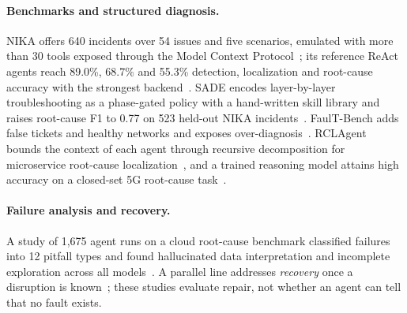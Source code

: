 \documentclass[pdflatex,sn-basic,Numbered,iicol]{sn-jnl}
\begin{document}
\paragraph{Benchmarks and structured diagnosis.} NIKA offers 640 incidents over 54 issues and five scenarios, emulated with more than 30 tools exposed through the Model Context Protocol~\cite{mcp2024}; its reference ReAct~\cite{yao2023react} agents reach 89.0\%, 68.7\% and 55.3\% detection, localization and root-cause accuracy with the strongest backend~\cite{wang2025nika}. SADE encodes layer-by-layer troubleshooting as a phase-gated policy with a hand-written skill library and raises root-cause F1 to 0.77 on 523 held-out NIKA incidents~\cite{tseng2026sade}. FaulT-Bench adds false tickets and healthy networks and exposes over-diagnosis~\cite{tseng2026faultbench}. RCLAgent bounds the context of each agent through recursive decomposition for microservice root-cause localization~\cite{zhang2026rclagent}, and a trained reasoning model attains high accuracy on a closed-set 5G root-cause task~\cite{sana2025telelogs}.

\paragraph{Failure analysis and recovery.} A study of 1,675 agent runs on a cloud root-cause benchmark classified failures into 12 pitfall types and found hallucinated data interpretation and incomplete exploration across all models~\cite{kim2026agents}. A parallel line addresses \emph{recovery} once a disruption is known~\cite{huang2026llm,mwangi2026dqn,rawas2026bio}; these studies evaluate repair, not whether an agent can tell that no fault exists.
\end{document}
